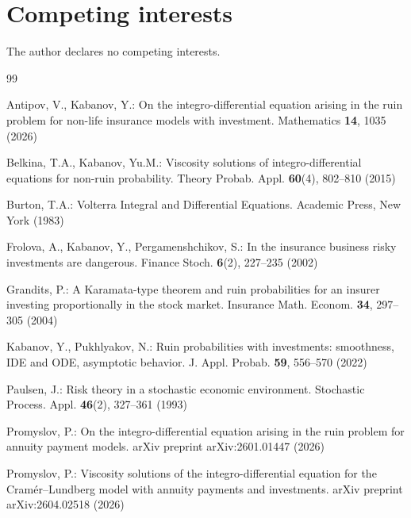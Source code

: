 \documentclass[smallextended]{svjour3}
\begin{document}
\section*{Competing interests}
The author declares no competing interests.


\begin{thebibliography}{99}

Antipov, V., Kabanov, Y.: 
On the integro-differential equation arising in the ruin problem for non-life insurance models with investment. 
Mathematics \textbf{14}, 1035 (2026)

Belkina, T.A., Kabanov, Yu.M.: 
Viscosity solutions of integro-differential equations for non-ruin probability. 
Theory Probab. Appl. \textbf{60}(4), 802--810 (2015)

Burton, T.A.: 
Volterra Integral and Differential Equations. 
Academic Press, New York (1983)

Frolova, A., Kabanov, Y., Pergamenshchikov, S.: 
In the insurance business risky investments are dangerous. 
Finance Stoch. \textbf{6}(2), 227--235 (2002)

Grandits, P.: 
A Karamata-type theorem and ruin probabilities for an insurer investing proportionally in the stock market. 
Insurance Math. Econom. \textbf{34}, 297--305 (2004)

Kabanov, Y., Pukhlyakov, N.: 
Ruin probabilities with investments: smoothness, IDE and ODE, asymptotic behavior. 
J. Appl. Probab. \textbf{59}, 556--570 (2022)

Paulsen, J.: 
Risk theory in a stochastic economic environment. 
Stochastic Process. Appl. \textbf{46}(2), 327--361 (1993)

Promyslov, P.: 
On the integro-differential equation arising in the ruin problem for annuity payment models. 
arXiv preprint arXiv:2601.01447 (2026)

Promyslov, P.: 
Viscosity solutions of the integro-differential equation for the Cram\'{e}r--Lundberg model with annuity payments and investments. 
arXiv preprint arXiv:2604.02518 (2026)

\end{thebibliography}
\end{document}
